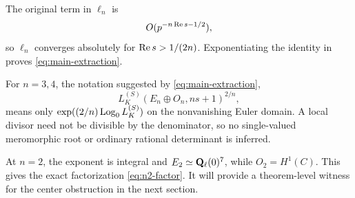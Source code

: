 The original term in \(\ell_n\) is
\[
 O(p^{-n\operatorname{Re} s-1/2}),
\]
so \(\ell_n\) converges absolutely for \(\operatorname{Re} s>1/(2n)\).
Exponentiating the identity in  proves
\eqref{eq:main-extraction}.

\begin{remark}
For \(n=3,4\), the notation suggested by
\eqref{eq:main-extraction},
\[
 L_K^{(S)}(E_n\oplus O_n,ns+1)^{2/n},
\]
means only
\(\exp((2/n)\operatorname{Log}_0 L_K^{(S)})\) on the nonvanishing Euler domain.  A local
divisor need not be divisible by the denominator, so no single-valued
meromorphic root or ordinary rational determinant is inferred.
\end{remark}

At \(n=2\), the exponent is integral and
\(E_2\simeq\mathbf Q_\ell(0)^7\), while \(O_2=H^1(C)\).  This gives the exact
factorization \eqref{eq:n2-factor}.  It will provide a theorem-level
witness for the center obstruction in the next section.
